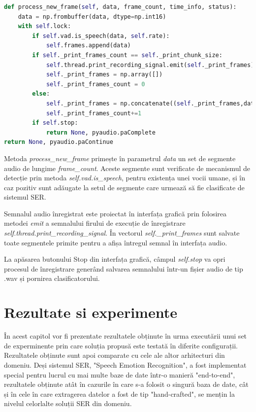 \documentclass[a4paper,12pt]{book}
\begin{document}
\begin{lstlisting}[language=Python, caption={Procesarea unui nou segmente al semnalului audio inregistrat. Daca segmentul nu contine discurs uman este exclus din inregistrarea finala.}]		
def process_new_frame(self, data, frame_count, time_info, status):
	data = np.frombuffer(data, dtype=np.int16)
	with self.lock:
		if self.vad.is_speech(data, self.rate):
			self.frames.append(data)
		if self._print_frames_count == self._print_chunk_size:
			self.thread.print_recording_signal.emit(self._print_frames)
			self._print_frames = np.array([])
			self._print_frames_count = 0
		else:
			self._print_frames = np.concatenate((self._print_frames,data), axis=0)
			self._print_frames_count+=1
		if self.stop:
			return None, pyaudio.paComplete
return None, pyaudio.paContinue	\end{lstlisting}
		Metoda \textit{process\_new\_frame} primește în parametrul \textit{data} un set de segmente audio de lungime \textit{frame\_count}. Aceste segmente sunt verificate de mecanismul de detecție prin metoda \textit{self.vad.is\_speech}, pentru existența unei vocii umane, și în caz pozitiv sunt adăugate la setul de segmente care urmează să fie clasificate de sistemul SER. \par
		Semnalul audio înregistrat este proiectat în interfața grafică prin folosirea metodei \textit{emit} a semnalului firului de execuție de înregistrare \textit{self.thread.print\_recording\_signal}. În vectorul \textit{self.\_print\_frames} sunt salvate toate segmentele primite pentru a afișa întregul semnal în interfața audio. \par
		La apăsarea butonului Stop din interfața grafică, câmpul \textit{self.stop} va opri procesul de înregistrare generând salvarea semnalului într-un fișier audio de tip .wav și pornirea clasificatorului.
		
		 
		\chapter{Rezultate si experimente} \label{rezultate}
		 
		 În acest capitol vor fi prezentate rezultatele obținute în urma executării unui set de experminente prin care soluția propusă este testată în diferite configurații. Rezultatele obținute sunt apoi comparate cu cele ale altor arhitecturi din domeniu. Deși sistemul SER, "Speech Emotion Recognition", a fost implementat special pentru lucrul cu mai multe baze de date într-o manieră "end-to-end", rezultatele obținute atât în cazurile în care s-a folosit o singură baza de date, cât și în cele în care extragerea datelor a fost de tip "hand-crafted", se mențin la nivelul celorlalte soluții SER din domeniu.\par
		 
\end{document}
